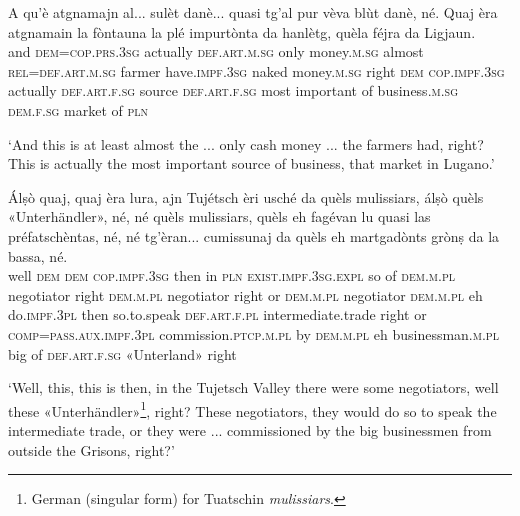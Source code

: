 \begin{linenumbers}
\gll A qu’è atgnamajn al... sulèt danè... quasi tg’al pur vèva blùt danè, né. Quaj èra atgnamain la fòntauna la plé impurtònta da hanlètg, quèla féjra da Ligjaun.\\
  and \textsc{dem=cop.prs.3sg} actually \textsc{def.art.m.sg} only money.\textsc{m.sg} almost   \textsc{rel=def.art.m.sg} farmer have.\textsc{impf.3sg} naked money.\textsc{m.sg} right \textsc{dem} \textsc{cop.impf.3sg} actually  \textsc{def.art.f.sg} source \textsc{def.art.f.sg} most important of business.\textsc{m.sg} \textsc{dem.f.sg} market of \textsc{pln}\\ 
\end{linenumbers}
\medskip
\glt `And this is at least almost the ... only cash money ... the farmers had, right? This is actually the most important source of  business, that market in Lugano.'
\medskip

\begin{linenumbers}
\gll Álṣò quaj, quaj èra lura, ajn Tujétsch èri usché da quèls mulissiars, álṣò quèls «Unterhändler», né, né quèls mulissiars, quèls eh fagévan lu quasi las préfatschèntas, né, né tg’èran... cumissunaj da quèls eh martgadònts grònṣ da la bassa, né.\\
  well \textsc{dem} \textsc{dem} \textsc{cop.impf.3sg} then in \textsc{pln} \textsc{exist.impf.3sg.expl} so of \textsc{dem.m.pl} negotiator right \textsc{dem.m.pl} negotiator right or \textsc{dem.m.pl} negotiator \textsc{dem.m.pl} eh do.\textsc{impf.3pl} then so.to.speak \textsc{def.art.f.pl}  intermediate.trade right or \textsc{comp=pass.aux.impf.3pl} commission.\textsc{ptcp.m.pl} by \textsc{dem.m.pl} eh businessman.\textsc{m.pl} big of \textsc{def.art.f.sg} «Unterland» right \\
\end{linenumbers}
\medskip
 \glt `Well, this, this is then, in the Tujetsch Valley there were some negotiators, well these «Unterhändler»\footnote{German (singular form) for Tuatschin \textit{mulissiars}.}, right? These negotiators, they would do so to speak the intermediate trade, or they were ... commissioned by the big businessmen from outside the Grisons, right?'
\medskip

